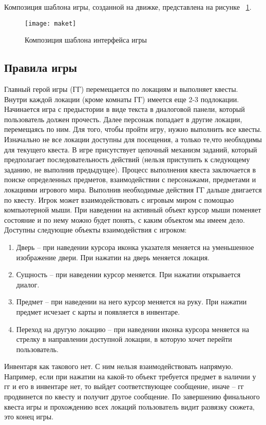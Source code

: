 Композиция шаблона игры, созданной на движке, представлена на рисунке ~\ref{maket:image}.

\begin{figure}[ht]
\texttt{[image: maket]}
\caption{Композиция шаблона интерфейса игры}
\label{maket:image}
\end{figure}

\subsection{Правила игры}

Главный герой игры (ГГ) перемещается по локациям и выполняет квесты. Внутри каждой локации (кроме комнаты ГГ) имеется еще 2-3 подлокации. Начинается игра с предыстории в виде текста в диалоговой панели, который пользователь должен прочесть. Далее персонаж попадает в другие локации, перемещаясь по ним. Для того, чтобы пройти игру, нужно выполнить все квесты. Изначально не все локации доступны для посещения, а только те,что необходимы для текущего квеста. В игре присутствует цепочный механизм заданий, который предполагает последовательность действий (нельзя приступить к следующему заданию, не выполнив предыдущее).
Процесс выполнения квеста заключается в поиске определенных предметов, взаимодействии с персонажами, предметами и локациями игрового мира. Выполнив необходимые действия ГГ дальше двигается по квесту. Игрок может взаимодействовать с игровым миром с помощью компьютерной мыши. При наведении на активный объект курсор мыши поменяет состояние и по нему можно будет понять, с каким объектом мы имеем дело. Доступны следующие объекты взаимодействия с игроком:
\begin{enumerate}
\item Дверь – при наведении курсора иконка указателя меняется на уменьшенное изображение двери. При нажатии на дверь меняется локация.
\item Сущность – при наведении курсор меняется. При нажатии открывается диалог.
\item Предмет – при наведении на него курсор меняется на руку. При нажатии предмет исчезает с карты и появляется в инвентаре.
\item Переход на другую локацию – при наведении иконка курсора меняется на стрелку в направлении доступной локации, в которую хочет перейти пользователь.
\end{enumerate}
Инвентаря как такового нет. С ним нельзя взаимодействовать напрямую. Например, если при нажатии на какой-то объект требуется предмет в наличии у гг и его в инвентаре нет, то выйдет соответствующее сообщение, иначе – гг продвинется по квесту и получит другое сообщение.
По завершению финального квеста игры и прохождению всех локаций пользователь видит развязку сюжета, это конец игры.

